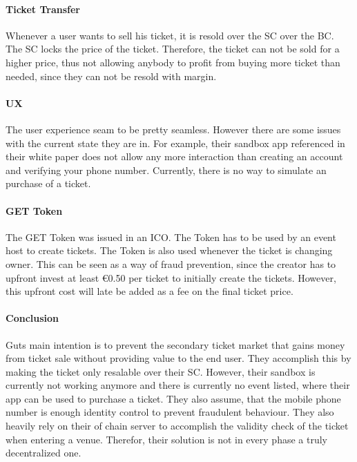 \paragraph{Ticket Transfer}
Whenever a user wants to sell his ticket, it is resold over the SC over the BC. The SC locks the price of the ticket. Therefore, the ticket can not be sold for a higher price, thus not allowing anybody to profit from buying more ticket than needed, since they can not be resold with margin.


\paragraph{UX}
The user experience seam to be pretty seamless. However there are some issues with the current state they are in. For example, their sandbox app referenced in their white paper does not allow any more interaction than creating an account and verifying your phone number. Currently, there is no way to simulate an purchase of a ticket.


\paragraph{GET Token}
The GET Token was issued in an ICO. The Token has to be used by an event host to create tickets. The Token is also used whenever the ticket is changing owner. This can be seen as a way of fraud prevention, since the creator has to upfront invest at least \euro0.50 per ticket to initially create the tickets. However, this upfront cost will late be added as a fee on the final ticket price.


\paragraph{Conclusion}
Guts main intention is to prevent the secondary ticket market that gains money from ticket sale without providing value to the  end user. They accomplish this by making the ticket only resalable over their SC. However, their sandbox is currently not working anymore and there is currently no event listed, where their app can be used to purchase a ticket. They also assume, that the mobile phone number is enough identity control to prevent fraudulent behaviour. They also heavily rely on their of chain server to accomplish the validity check of the ticket when entering a venue. Therefor, their solution is not in every phase a truly decentralized one.
